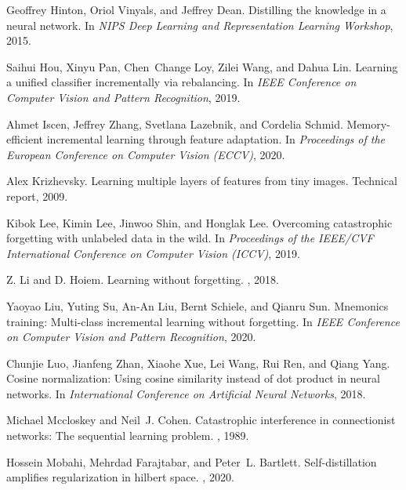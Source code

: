 \documentclass[final]{cvpr}
\begin{document}
\begin{thebibliography}{10}
Geoffrey Hinton, Oriol Vinyals, and Jeffrey Dean.
\newblock Distilling the knowledge in a neural network.
\newblock In {\em NIPS Deep Learning and Representation Learning Workshop},
  2015.

Saihui Hou, Xinyu Pan, Chen~Change Loy, Zilei Wang, and Dahua Lin.
\newblock Learning a unified classifier incrementally via rebalancing.
\newblock In {\em IEEE Conference on Computer Vision and Pattern Recognition},
  2019.

Ahmet Iscen, Jeffrey Zhang, Svetlana Lazebnik, and Cordelia Schmid.
\newblock Memory-efficient incremental learning through feature adaptation.
\newblock In {\em Proceedings of the European Conference on Computer Vision
  (ECCV)}, 2020.

Alex Krizhevsky.
\newblock Learning multiple layers of features from tiny images.
\newblock Technical report, 2009.

Kibok Lee, Kimin Lee, Jinwoo Shin, and Honglak Lee.
\newblock Overcoming catastrophic forgetting with unlabeled data in the wild.
\newblock In {\em Proceedings of the IEEE/CVF International Conference on
  Computer Vision (ICCV)}, 2019.

Z. {Li} and D. {Hoiem}.
\newblock Learning without forgetting.
,
  2018.

Yaoyao Liu, Yuting Su, An{-}An Liu, Bernt Schiele, and Qianru Sun.
\newblock Mnemonics training: Multi-class incremental learning without
  forgetting.
\newblock In {\em IEEE Conference on Computer Vision and Pattern Recognition},
  2020.

Chunjie Luo, Jianfeng Zhan, Xiaohe Xue, Lei Wang, Rui Ren, and Qiang Yang.
\newblock Cosine normalization: Using cosine similarity instead of dot product
  in neural networks.
\newblock In {\em International Conference on Artificial Neural Networks},
  2018.

Michael Mccloskey and Neil~J. Cohen.
\newblock Catastrophic interference in connectionist networks: {T}he sequential
  learning problem.
, 1989.

Hossein Mobahi, Mehrdad Farajtabar, and Peter~L. Bartlett.
\newblock Self-distillation amplifies regularization in hilbert space.
, 2020.


\end{thebibliography}
\end{document}

